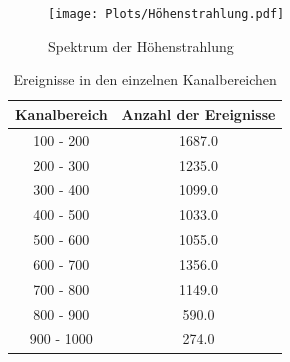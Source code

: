 \documentclass[11pt, a4paper]{article}
\begin{document}
    \begin{figure}[!h]
        \centering
        \texttt{[image: Plots/Höhenstrahlung.pdf]}
        \caption{Spektrum der Höhenstrahlung}
        \label{fig:Höhenspekt}
    \end{figure}

    \begin{table}
        \centering
        \begin{tabular}{c|c}
            
            Kanalbereich & Anzahl der Ereignisse\\ \hline
            100 - 200 & 1687.0\\  \hline
            200 - 300 & 1235.0\\ \hline
            300 - 400 & 1099.0\\ \hline
            400 - 500 & 1033.0\\ \hline
            500 - 600 & 1055.0\\ \hline
            600 - 700 & 1356.0\\ \hline
            700 - 800 & 1149.0\\ \hline
            800 - 900 & 590.0\\ \hline
            900 - 1000  & 274.0\\ \hline

            
        \end{tabular}
        \caption{Ereignisse in den einzelnen Kanalbereichen}
        \label{tab:Höhenereig}
    \end{table}

    
\end{document}
